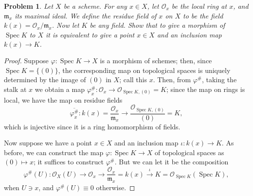\documentclass[12pt,letterpaper]{article}
\newtheorem{problem}{Problem}[section]
\theoremstyle{definition}
\theoremstyle{remark}
\numberwithin{equation}{section}
\numberwithin{figure}{problem}
\DeclareMathOperator{\Spec}{Spec}
\newcommand{\OO}{\mathcal{O}}
\begin{document}
\begin{problem}
  Let $X$ be a scheme. For any $x \in X$, let $\OO_x$ be the local ring at $x$, and $\mathfrak{m}_x$ its maximal ideal. We define the \emph{residue field} of $x$ on $X$ to be the field $k(x) = \OO_x/\mathfrak{m}_x$. Now let $K$ be any field. Show that to give a morphism of $\Spec K$ to $X$ it is equivalent to give a point $x \in X$ and an inclusion map $k(x) \to K$.
\end{problem}
\begin{proof}
  Suppose $\varphi\colon\Spec K \to X$ is a morphism of schemes; then, since $\Spec K = \{(0)\}$, the corresponding map on topological spaces is uniquely determined by the image of $(0)$ in $X$; call this $x$. Then, from $\varphi^\#$, taking the stalk at $x$ we obtain a map $\varphi^\#_x\colon \OO_x \to \OO_{\Spec K,(0)} = K$; since the map on rings is local, we have the map on residue fields
  \begin{equation*}
    \overline{\varphi^\#_x} \colon k(x) = \frac{\OO_x}{\mathfrak{m}_x} \to \frac{\OO_{\Spec K,(0)}}{(0)} = K,
  \end{equation*}
  which is injective since it is a ring homomorphism of fields.
  \par Now suppose we have a point $x \in X$ and an inclusion map $\iota\colon k(x) \to K$. As before, we can construct the map $\varphi\colon\Spec K \to X$ of topological spaces as $(0) \mapsto x$; it suffices to construct $\varphi^\#$. But we can let it be the composition
  \begin{equation*}
    \varphi^\#(U)\colon \OO_X(U) \to \OO_x \to \frac{\OO_x}{\mathfrak{m}_x} = k(x) \overset{\iota}{\longrightarrow} K = \OO_{\Spec K}(\Spec K),
  \end{equation*}
  when $U \ni x$, and $\varphi^\#(U) \equiv 0$ otherwise.
\end{proof}
\end{document}
